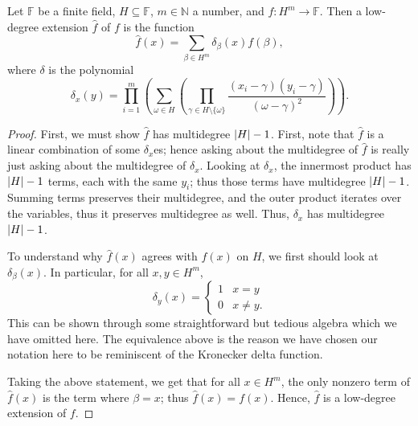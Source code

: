 \begin{thm}
  Let $\mathbb{F}$ be a finite field, $H \subseteq \mathbb{F}$, $m \in \mathbb{N}$ a number, and
  $f: H^{m} \rightarrow \mathbb{F}$. Then a low-degree extension $\hat{f}$ of $f$ is the
  function
  \begin{equation}
    \hat{f}(x) = \sum_{\beta \in H^{m}}\delta_{\beta}(x)f(\beta),
  \end{equation}
  where $\delta$ is the polynomial
  \begin{equation}\label{eqn:delta-poly}
    \delta_{x}(y) = \prod_{i = 1}^{m}\left(\sum_{\omega \in H}\left(
        \prod_{\gamma \in H \setminus \{\omega\}}\frac{(x_{i} - \gamma)(y_{i} - \gamma)}{(\omega - \gamma)^{2}}
      \right)\right).
  \end{equation}
\end{thm}

\begin{proof}
  First, we must show $\hat{f}$ has multidegree $\lvert H\rvert - 1$. First, note that
  $\hat{f}$ is a linear combination of some $\delta_{x}$es; hence asking about the
  multidegree of $\hat{f}$ is really just asking about the multidegree of
  $\delta_{x}$. Looking at $\delta_{x}$, the innermost product has $\lvert H\rvert - 1$ terms,
  each with the same $y_{i}$; thus those terms have multidegree $\lvert H\rvert - 1$.
  Summing terms preserves their multidegree, and the outer product iterates over
  the variables, thus it preserves multidegree as well. Thus, $\delta_{x}$ has
  multidegree $\lvert H\rvert - 1$.

  To understand why $\hat{f}(x)$ agrees with $f(x)$ on $H$, we first should look
  at $\delta_{\beta}(x)$. In particular, for all $x, y \in H^{m}$,
  \begin{equation*}
    \delta_{y}(x) = \begin{cases}
      1 & x = y \\
      0 & x \ne y.
    \end{cases}
  \end{equation*}
  This can be shown through some straightforward but tedious algebra which we
  have omitted here. The equivalence above is the reason we have chosen our
  notation here to be reminiscent of the Kronecker delta function.

  Taking the above statement, we get that for all $x \in H^{m}$, the only nonzero
  term of $\hat{f}(x)$ is the term where $\beta = x$; thus $\hat{f}(x) = f(x)$.
  Hence, $\hat{f}$ is a low-degree extension of $f$.
\end{proof}

